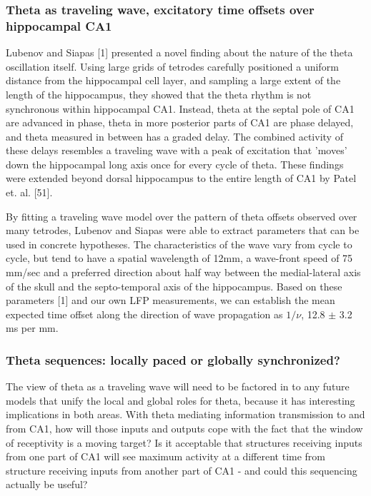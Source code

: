 \documentclass[]{article}
\begin{document}
\subsubsection{Theta as traveling wave, excitatory time offsets over
hippocampal CA1}

Lubenov and Siapas {[}1{]} presented a novel finding about the nature of
the theta oscillation itself. Using large grids of tetrodes carefully
positioned a uniform distance from the hippocampal cell layer, and
sampling a large extent of the length of the hippocampus, they showed
that the theta rhythm is not synchronous within hippocampal CA1.
Instead, theta at the septal pole of CA1 are advanced in phase, theta in
more posterior parts of CA1 are phase delayed, and theta measured in
between has a graded delay. The combined activity of these delays
resembles a traveling wave with a peak of excitation that 'moves' down
the hippocampal long axis once for every cycle of theta. These findings
were extended beyond dorsal hippocampus to the entire length of CA1 by
Patel et. al. {[}51{]}.

By fitting a traveling wave model over the pattern of theta offsets
observed over many tetrodes, Lubenov and Siapas were able to extract
parameters that can be used in concrete hypotheses. The characteristics
of the wave vary from cycle to cycle, but tend to have a spatial
wavelength of 12mm, a wave-front speed of 75 mm/sec and a preferred
direction about half way between the medial-lateral axis of the skull
and the septo-temporal axis of the hippocampus. Based on these
parameters {[}1{]} and our own LFP measurements, we can establish the
mean expected time offset along the direction of wave propagation as
\(1/\nu\), 12.8 \(\pm\) 3.2 ms per mm.

\subsubsection{Theta sequences: locally paced or globally synchronized?}

The view of theta as a traveling wave will need to be factored in to any
future models that unify the local and global roles for theta, because
it has interesting implications in both areas. With theta mediating
information transmission to and from CA1, how will those inputs and
outputs cope with the fact that the window of receptivity is a moving
target? Is it acceptable that structures receiving inputs from one part
of CA1 will see maximum activity at a different time from structure
receiving inputs from another part of CA1 - and could this sequencing
actually be useful?
\end{document}
